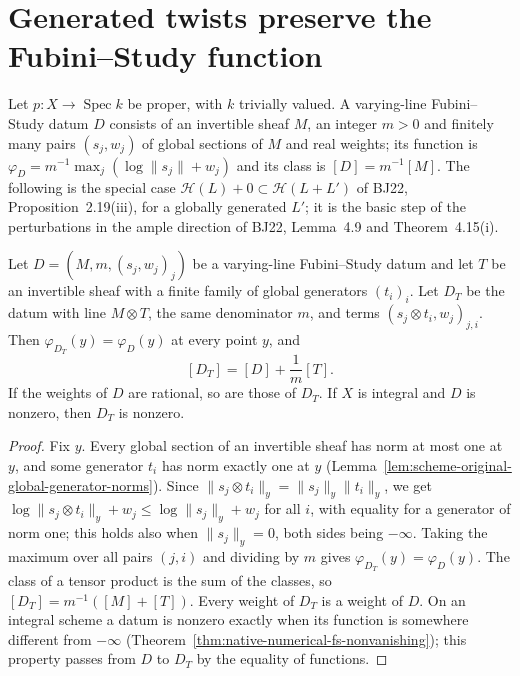 \section{Generated twists preserve the Fubini--Study function}
\label{sec:native-numerical-psh-generated-twists}

Let $p:X\to\operatorname{Spec}k$ be proper, with $k$ trivially valued.  A
varying-line Fubini--Study datum $D$ consists of an invertible sheaf $M$, an
integer $m>0$ and finitely many pairs $(s_j,w_j)$ of global sections of $M$
and real weights; its function is
$\varphi_D=m^{-1}\max_j(\log\lVert s_j\rVert+w_j)$ and its class is
$[D]=m^{-1}[M]$.  The following is the special case
$\mathcal H(L)+0\subset\mathcal H(L+L')$ of BJ22, Proposition~2.19(iii), for a
globally generated $L'$; it is the basic step of the perturbations in the
ample direction of BJ22, Lemma~4.9 and Theorem~4.15(i).

\begin{theorem}
\label{thm:native-numerical-generated-twist-exact}
\leanok
{}
Let $D=(M,m,(s_j,w_j)_j)$ be a varying-line Fubini--Study datum and let $T$
be an invertible sheaf with a finite family of global generators
$(t_i)_i$.  Let $D_T$ be the datum with line $M\otimes T$, the same
denominator $m$, and terms $(s_j\otimes t_i,w_j)_{j,i}$.  Then
$\varphi_{D_T}(y)=\varphi_D(y)$ at every point $y$, and
\[
 [D_T]=[D]+\frac1m[T].
\]
If the weights of $D$ are rational, so are those of $D_T$.  If $X$ is
integral and $D$ is nonzero, then $D_T$ is nonzero.
\end{theorem}
\begin{proof}
Fix $y$.  Every global section of an invertible sheaf has norm at most one
at $y$, and some generator $t_i$ has norm exactly one at $y$
(Lemma~\ref{lem:scheme-original-global-generator-norms}).  Since
$\lVert s_j\otimes t_i\rVert_y=\lVert s_j\rVert_y\lVert t_i\rVert_y$, we get
$\log\lVert s_j\otimes t_i\rVert_y+w_j\le\log\lVert s_j\rVert_y+w_j$ for all
$i$, with equality for a generator of norm one; this holds also when
$\lVert s_j\rVert_y=0$, both sides being $-\infty$.  Taking the maximum over
all pairs $(j,i)$ and dividing by $m$ gives $\varphi_{D_T}(y)=\varphi_D(y)$.
The class of a tensor product is the sum of the classes, so
$[D_T]=m^{-1}([M]+[T])$.  Every weight of $D_T$ is a weight of $D$.  On an
integral scheme a datum is nonzero exactly when its function is somewhere
different from $-\infty$
(Theorem~\ref{thm:native-numerical-fs-nonvanishing}); this property passes
from $D$ to $D_T$ by the equality of functions.
\end{proof}

